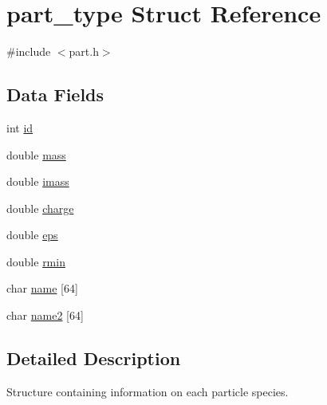 \hypertarget{structpart__type}{\section{part\-\_\-type Struct Reference}
\label{structpart__type}
}


{\ttfamily \#include $<$part.\-h$>$}

\subsection*{Data Fields}
\begin{DoxyCompactItemize}
\item 
int \hyperlink{structpart__type_a7441ef0865bcb3db9b8064dd7375c1ea}{id}
\item 
double \hyperlink{structpart__type_a244bf42c46054cf1113be44d55f2156d}{mass}
\item 
double \hyperlink{structpart__type_a6c852117018467a4f780f5e234f2c83c}{imass}
\item 
double \hyperlink{structpart__type_ab3eb30b2f3f9c5ff812ea037220be570}{charge}
\item 
double \hyperlink{structpart__type_a974b448c3d0a13d483d36ef15de369b5}{eps}
\item 
double \hyperlink{structpart__type_a6b40e64084cc0e48b7a6be3c8d0c6ee6}{rmin}
\item 
char \hyperlink{structpart__type_ad53db8acabbf75e31bf23d9f20a2c847}{name} \mbox{[}64\mbox{]}
\item 
char \hyperlink{structpart__type_a431d546b86bad034e7104d8a4994f19c}{name2} \mbox{[}64\mbox{]}
\end{DoxyCompactItemize}


\subsection{Detailed Description}
Structure containing information on each particle species. 

